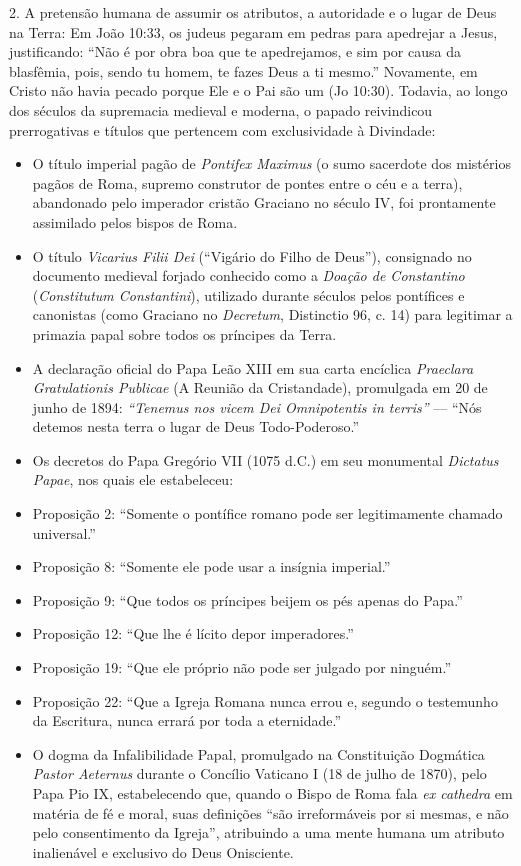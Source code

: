 2. A pretensão humana de assumir os atributos, a autoridade e o lugar de Deus na Terra: Em João 10:33, os judeus pegaram em pedras para apedrejar a Jesus, justificando: ``Não é por obra boa que te apedrejamos, e sim por causa da blasfêmia, pois, sendo tu homem, te fazes Deus a ti mesmo.'' Novamente, em Cristo não havia pecado porque Ele e o Pai são um (Jo 10:30). Todavia, ao longo dos séculos da supremacia medieval e moderna, o papado reivindicou prerrogativas e títulos que pertencem com exclusividade à Divindade:
\begin{itemize}
  \item O título imperial pagão de \textit{Pontifex Maximus} (o sumo sacerdote dos mistérios pagãos de Roma, supremo construtor de pontes entre o céu e a terra), abandonado pelo imperador cristão Graciano no século IV, foi prontamente assimilado pelos bispos de Roma.
  \item O título \textit{Vicarius Filii Dei} (``Vigário do Filho de Deus''), consignado no documento medieval forjado conhecido como a \textit{Doação de Constantino} (\textit{Constitutum Constantini}), utilizado durante séculos pelos pontífices e canonistas (como Graciano no \textit{Decretum}, Distinctio 96, c. 14) para legitimar a primazia papal sobre todos os príncipes da Terra.
  \item A declaração oficial do Papa Leão XIII em sua carta encíclica \textit{Praeclara Gratulationis Publicae} (A Reunião da Cristandade), promulgada em 20 de junho de 1894: \textit{``Tenemus nos vicem Dei Omnipotentis in terris''} — ``Nós detemos nesta terra o lugar de Deus Todo-Poderoso.''
  \item Os decretos do Papa Gregório VII (1075 d.C.) em seu monumental \textit{Dictatus Papae}, nos quais ele estabeleceu:
  \item Proposição 2: ``Somente o pontífice romano pode ser legitimamente chamado universal.''
  \item Proposição 8: ``Somente ele pode usar a insígnia imperial.''
  \item Proposição 9: ``Que todos os príncipes beijem os pés apenas do Papa.''
  \item Proposição 12: ``Que lhe é lícito depor imperadores.''
  \item Proposição 19: ``Que ele próprio não pode ser julgado por ninguém.''
  \item Proposição 22: ``Que a Igreja Romana nunca errou e, segundo o testemunho da Escritura, nunca errará por toda a eternidade.''
  \item O dogma da Infalibilidade Papal, promulgado na Constituição Dogmática \textit{Pastor Aeternus} durante o Concílio Vaticano I (18 de julho de 1870), pelo Papa Pio IX, estabelecendo que, quando o Bispo de Roma fala \textit{ex cathedra} em matéria de fé e moral, suas definições ``são irreformáveis por si mesmas, e não pelo consentimento da Igreja'', atribuindo a uma mente humana um atributo inalienável e exclusivo do Deus Onisciente.
\end{itemize}




